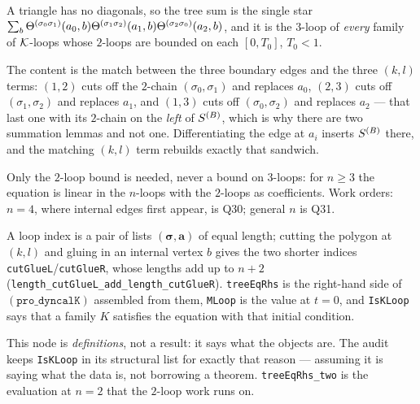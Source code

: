 \begin{lemma}[$\mathtt{(eq\_Ktree)}$ at $n=3$]\label{lem:treeThree}
  \leanok
  A triangle has no diagonals, so the tree sum is the single star
  $\sum_b\Theta^{(\sigma_0\sigma_1)}(a_0,b)\Theta^{(\sigma_1\sigma_2)}(a_1,b)\Theta^{(\sigma_2\sigma_0)}(a_2,b)$,
  and it is the $3$-loop of \emph{every} family of $\mathcal{K}$-loops whose $2$-loops are
  bounded on each $[0,T_0]$, $T_0<1$.

  The content is the match between the three boundary edges and the three $(k,l)$ terms:
  $(1,2)$ cuts off the $2$-chain $(\sigma_0,\sigma_1)$ and replaces $a_0$, $(2,3)$ cuts off
  $(\sigma_1,\sigma_2)$ and replaces $a_1$, and $(1,3)$ cuts off $(\sigma_0,\sigma_2)$ and
  replaces $a_2$ --- that last one with its $2$-chain on the \emph{left} of $S^{(B)}$, which is
  why there are two summation lemmas and not one.  Differentiating the edge at $a_i$
  inserts $S^{(B)}$ there, and the matching $(k,l)$ term rebuilds exactly that sandwich.

  Only the $2$-loop bound is needed, never a bound on $3$-loops: for $n\ge3$ the equation
  is linear in the $n$-loops with the $2$-loops as coefficients.
  Work orders: $n=4$, where internal edges first appear, is Q30; general $n$ is Q31.
\end{lemma}

\begin{definition}\label{def:kloop}
  \leanok
  A loop index is a pair of lists $(\bm\sigma,\mathbf a)$ of equal length; cutting the
  polygon at $(k,l)$ and gluing in an internal vertex $b$ gives the two shorter indices
  \texttt{cutGlueL}/\texttt{cutGlueR}, whose lengths add up to $n+2$
  (\texttt{length\_cutGlueL\_add\_length\_cutGlueR}).  \texttt{treeEqRhs} is the right-hand
  side of $\mathtt{(pro\_dyncalK)}$ assembled from them, \texttt{MLoop} is the value at
  $t=0$, and \texttt{IsKLoop} says that a family $K$ satisfies the equation with that
  initial condition.

  This node is \emph{definitions}, not a result: it says what the objects are.  The audit
  keeps \texttt{IsKLoop} in its structural list for exactly that reason --- assuming it is
  saying what the data is, not borrowing a theorem.  \texttt{treeEqRhs\_two} is the
  evaluation at $n=2$ that the $2$-loop work runs on.
\end{definition}

